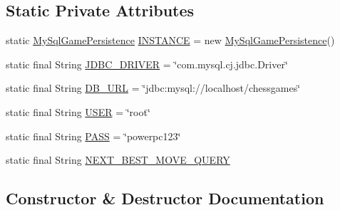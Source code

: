 \subsection*{Static Private Attributes}
\begin{DoxyCompactItemize}
\item 
static \mbox{\hyperlink{classcom_1_1chess_1_1pgn_1_1_my_sql_game_persistence}{My\+Sql\+Game\+Persistence}} \mbox{\hyperlink{classcom_1_1chess_1_1pgn_1_1_my_sql_game_persistence_adf58e31268ce6cc5cb9fb8476256e063}{I\+N\+S\+T\+A\+N\+CE}} = new \mbox{\hyperlink{classcom_1_1chess_1_1pgn_1_1_my_sql_game_persistence}{My\+Sql\+Game\+Persistence}}()
\item 
static final String \mbox{\hyperlink{classcom_1_1chess_1_1pgn_1_1_my_sql_game_persistence_a31e9975542030076c68b9315e77a77b6}{J\+D\+B\+C\+\_\+\+D\+R\+I\+V\+ER}} = \char`\"{}com.\+mysql.\+cj.\+jdbc.\+Driver\char`\"{}
\item 
static final String \mbox{\hyperlink{classcom_1_1chess_1_1pgn_1_1_my_sql_game_persistence_a372a5459afcbd00b6e55d6eca24208ed}{D\+B\+\_\+\+U\+RL}} = \char`\"{}jdbc\+:mysql\+://localhost/chessgames\char`\"{}
\item 
static final String \mbox{\hyperlink{classcom_1_1chess_1_1pgn_1_1_my_sql_game_persistence_af4ac5abc03d5ba43828ab4d7e58fb281}{U\+S\+ER}} = \char`\"{}root\char`\"{}
\item 
static final String \mbox{\hyperlink{classcom_1_1chess_1_1pgn_1_1_my_sql_game_persistence_a243f4f83fb0c949343435289c8a33e68}{P\+A\+SS}} = \char`\"{}powerpc123\char`\"{}
\item 
static final String \mbox{\hyperlink{classcom_1_1chess_1_1pgn_1_1_my_sql_game_persistence_a766fe9b1704fb165e9f75d8345260ad3}{N\+E\+X\+T\+\_\+\+B\+E\+S\+T\+\_\+\+M\+O\+V\+E\+\_\+\+Q\+U\+E\+RY}}
\end{DoxyCompactItemize}


\subsection{Constructor \& Destructor Documentation}
\mbox{\label{classcom_1_1chess_1_1pgn_1_1_my_sql_game_persistence_a14f78ef2805a49000da78a79d77cf473}} 
